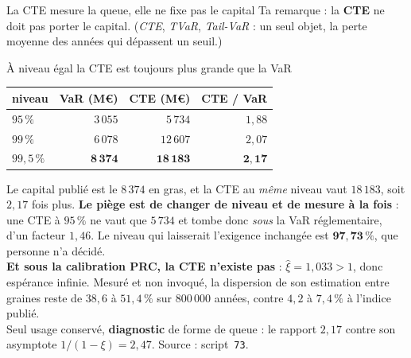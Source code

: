 \documentclass[11pt]{beamer}
\begin{document}
\begin{frame}{La CTE mesure la queue, elle ne fixe pas le capital}
\small
Ta remarque : la \textbf{CTE} ne doit pas porter le capital. (\emph{CTE}, \emph{TVaR},
\emph{Tail-VaR} : un seul objet, la perte moyenne des années qui dépassent un seuil.)
\vspace{-1mm}
\begin{block}{À niveau égal la CTE est toujours plus grande que la VaR}
\centering
\begin{tabular}{@{}l r r r@{}}
\toprule
\textbf{niveau} & \textbf{VaR} (M\euro) & \textbf{CTE} (M\euro) & \textbf{CTE / VaR} \\
\midrule
$95\,\%$     & $3\,055$          & $5\,734$           & $1{,}88$ \\
$99\,\%$     & $6\,078$          & $12\,607$          & $2{,}07$ \\
$99{,}5\,\%$ & $\mathbf{8\,374}$ & $\mathbf{18\,183}$ & $\mathbf{2{,}17}$ \\
\bottomrule
\end{tabular}
\end{block}
\vspace{-1mm}
{\footnotesize Le capital publié est le $8\,374$ en gras, et la CTE au \emph{même} niveau vaut
$18\,183$, soit $2{,}17$ fois plus. \textbf{Le piège est de changer de niveau et de mesure à la
fois} : une CTE à $95\,\%$ ne vaut que $5\,734$ et tombe donc \emph{sous} la VaR réglementaire,
d'un facteur $1{,}46$. Le niveau qui laisserait l'exigence inchangée est
$\mathbf{97{,}73\,\%}$, que personne n'a décidé.\\[3pt]
\textbf{Et sous la calibration PRC, la CTE n'existe pas} : $\hat\xi=1{,}033>1$, donc espérance
infinie. Mesuré et non invoqué, la dispersion de son estimation entre graines reste de $38{,}6$ à
$51{,}4\,\%$ sur $800\,000$ années, contre $4{,}2$ à $7{,}4\,\%$ à l'indice publié.\\[3pt]
Seul usage conservé, \textbf{diagnostic} de forme de queue : le rapport $2{,}17$ contre son
asymptote $1/(1-\xi)=2{,}47$. Source : script~\texttt{73}.}
\end{frame}
\end{document}
